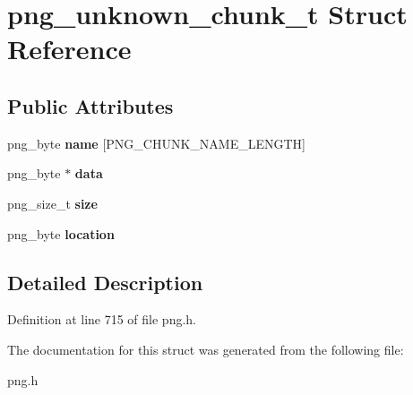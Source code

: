 \hypertarget{structpng__unknown__chunk__t}{\section{png\+\_\+unknown\+\_\+chunk\+\_\+t Struct Reference}
\label{structpng__unknown__chunk__t}
}
\subsection*{Public Attributes}
\begin{DoxyCompactItemize}
\item 
\hypertarget{structpng__unknown__chunk__t_a53686ea85d0701924ad5ac69e43fb5b9}{png\+\_\+byte {\bfseries name} \mbox{[}P\+N\+G\+\_\+\+C\+H\+U\+N\+K\+\_\+\+N\+A\+M\+E\+\_\+\+L\+E\+N\+G\+T\+H\mbox{]}}\label{structpng__unknown__chunk__t_a53686ea85d0701924ad5ac69e43fb5b9}

\item 
\hypertarget{structpng__unknown__chunk__t_a4f37f6acbe4e2c287078bcdf03d8ee92}{png\+\_\+byte $\ast$ {\bfseries data}}\label{structpng__unknown__chunk__t_a4f37f6acbe4e2c287078bcdf03d8ee92}

\item 
\hypertarget{structpng__unknown__chunk__t_a0a691245e0c04f01ecf767f215b6a652}{png\+\_\+size\+\_\+t {\bfseries size}}\label{structpng__unknown__chunk__t_a0a691245e0c04f01ecf767f215b6a652}

\item 
\hypertarget{structpng__unknown__chunk__t_af56bfc32223b97fbcb6bd29ba7a1cc29}{png\+\_\+byte {\bfseries location}}\label{structpng__unknown__chunk__t_af56bfc32223b97fbcb6bd29ba7a1cc29}

\end{DoxyCompactItemize}


\subsection{Detailed Description}


Definition at line 715 of file png.\+h.



The documentation for this struct was generated from the following file\+:\begin{DoxyCompactItemize}
\item 
png.\+h\end{DoxyCompactItemize}
